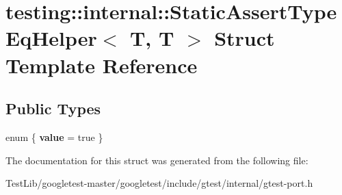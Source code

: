 \hypertarget{structtesting_1_1internal_1_1StaticAssertTypeEqHelper_3_01T_00_01T_01_4}{}\section{testing\+:\+:internal\+:\+:Static\+Assert\+Type\+Eq\+Helper$<$ T, T $>$ Struct Template Reference}
\label{structtesting_1_1internal_1_1StaticAssertTypeEqHelper_3_01T_00_01T_01_4}
\subsection*{Public Types}
\begin{DoxyCompactItemize}
\item 
\mbox{\label{structtesting_1_1internal_1_1StaticAssertTypeEqHelper_3_01T_00_01T_01_4_acdb69a9c4164628ea6a80bd6442058c6}} 
enum \{ {\bfseries value} = true
 \}
\end{DoxyCompactItemize}


The documentation for this struct was generated from the following file\+:\begin{DoxyCompactItemize}
\item 
Test\+Lib/googletest-\/master/googletest/include/gtest/internal/gtest-\/port.\+h\end{DoxyCompactItemize}
